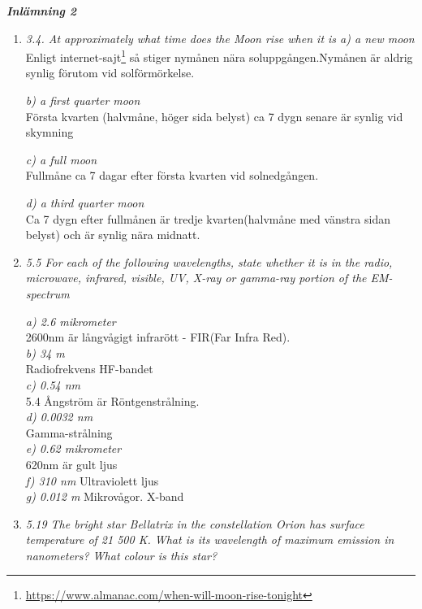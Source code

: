 \documentclass[./exercises.tex]{subfiles}
\begin{document}
\textit{\textbf{Inlämning 2  } }
\begin{enumerate}
\item \textit{3.4. At approximately what time does the Moon rise when it is
a) a new moon}\\

Enligt internet-sajt\footnote{\url{https://www.almanac.com/when-will-moon-rise-tonight}}
så stiger nymånen nära soluppgången.Nymånen är aldrig synlig förutom vid
solförmörkelse.

\textit{b) a first quarter moon}\\

Första kvarten (halvmåne, höger sida belyst) ca 7 dygn senare är synlig vid skymning

\textit{c) a full moon}\\

Fullmåne ca 7 dagar efter första kvarten vid solnedgången.

\textit{d) a third quarter moon}\\
Ca 7 dygn efter fullmånen är tredje kvarten(halvmåne med vänstra sidan belyst) och
är synlig nära midnatt.



\item \textit{5.5 For each of the following wavelengths, state whether it is in the radio, microwave,
infrared, visible, UV, X-ray or gamma-ray portion of the EM-spectrum}

\textit{a) 2.6 mikrometer}\\
2600nm är långvågigt infrarött - FIR(Far Infra Red).\\
\textit{b) 34 m}\\
Radiofrekvens HF-bandet\\
\textit{c) 0.54 nm}\\
5.4 Ångström är Röntgenstrålning.\\

\textit{d) 0.0032 nm}\\
Gamma-strålning\\
\textit{e) 0.62 mikrometer}\\
620nm är gult ljus\\
\textit{f) 310 nm}
Ultraviolett ljus\\
\textit{g) 0.012 m}
Mikrovågor. X-band\\

\item \textit{5.19 The bright star Bellatrix in the constellation Orion has surface temperature of 21 500 K.
What is its wavelength of maximum emission in nanometers? What colour is this star?}\\


\end{enumerate}
\end{document}
